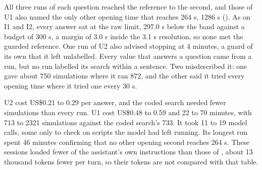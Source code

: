   \begin{table}[H]
    \centering
    \small
    \setlength{\tabcolsep}{4pt}
    \caption{The unseen questions, with the improved skills in all three runs, guarded values in
    brackets. Ranges are over the three runs. Tokens are input tokens.}
    \label{tab:results-unseen}
  \end{table}

  All three runs of each question reached the reference to the second, and those of U1 also named
  the only other opening time that reaches 264 s, 1286 s (). As on I1 and
  I2, every answer sat at the raw limit, 297.0 s below the band against a budget of 300 s, a margin
  of 3.0 s inside the 3.1 s resolution, so none met the guarded reference. One run of U2 also
  advised stopping at 4 minutes, a guard of its own that it left unlabelled. Every value that
  answers a question came from a run, but no run labelled its search within a sentence. Two
  misdescribed it: one gave about 750 simulations where it ran 872, and the other said it tried
  every opening time where it tried one every 30 s.

  U2 cost US\$0.21 to 0.29 per answer, and the coded search needed fewer simulations than every
  run. U1 cost US\$0.48 to 0.59 and 22 to 70 minutes, with 713 to 2321 simulations against the
  coded search's 733. It took 11 to 19 model calls, some only to check on scripts the model had left
  running. Its longest run spent 46 minutes confirming that no other opening second reaches
  264 s. These sessions loaded fewer of the assistant's own instructions than those of
  , about 13 thousand tokens fewer per turn, so their tokens are not
  compared with that table.
